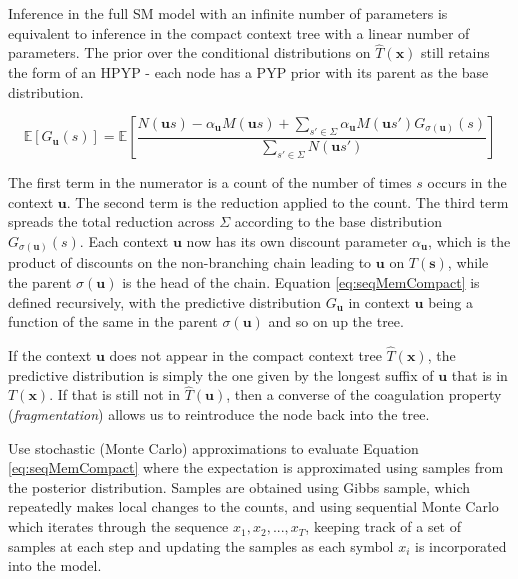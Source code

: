 Inference in the full SM model with an infinite number of parameters is equivalent to inference in the compact context tree with a linear number of parameters. The prior over the conditional distributions on $\hat{T}(\boldsymbol{x})$ still retains the form of an HPYP - each node has a PYP prior with its parent as the base distribution.

\begin{equation}
\mathbb E [G_{\boldsymbol{u}}(s)]=\mathbb E \left [ \frac{N(\boldsymbol{u}s)-\alpha_{\boldsymbol{u}}M(\boldsymbol{u}s)+\sum_{s'\in \Sigma}\alpha_{\boldsymbol{u}}M(\boldsymbol{u}s')G_{\sigma(\boldsymbol{u})}(s)}{\sum_{s'\in \Sigma}N(\boldsymbol{u}s')}\right ]
\label{eq:seqMemCompact}
\end{equation}

The first term in the numerator is a count of the number of times $s$ occurs in the context $\boldsymbol u$. The second term is the reduction applied to the count. The third term spreads the total reduction across $\Sigma$ according to the base distribution $G_{\sigma(\boldsymbol u)}(s)$. Each context $\boldsymbol u$ now has its own discount parameter $\alpha_{\boldsymbol u}$, which is the product of discounts on the non-branching chain leading to $\boldsymbol u$ on $T(\boldsymbol s)$, while the parent $\sigma(\boldsymbol u)$ is the head of the chain. Equation \ref{eq:seqMemCompact} is defined recursively, with the predictive distribution $G_{\boldsymbol u}$ in context $\boldsymbol u$ being a function of the same in the parent $\sigma(\boldsymbol u)$ and so on up the tree.

If the context $\boldsymbol u$ does not appear in the compact context tree $\hat{T}(\boldsymbol x)$, the predictive distribution is simply the one given by the longest suffix of $\boldsymbol u$ that is in $T(\boldsymbol x)$. If that is still not in $\hat{T}(\boldsymbol u)$, then a converse of the coagulation property (\textit{fragmentation}) allows us to reintroduce the node back into the tree.

Use stochastic (Monte Carlo) approximations to evaluate Equation \ref{eq:seqMemCompact} where the expectation is approximated using samples from the posterior distribution. Samples are obtained using Gibbs sample, which repeatedly makes local changes to the counts, and using sequential Monte Carlo which iterates through the sequence $x_{1}, x_{2}, ..., x_{T}$, keeping track of a set of samples at each step and updating the samples as each symbol $x_{i}$ is incorporated into the model.

